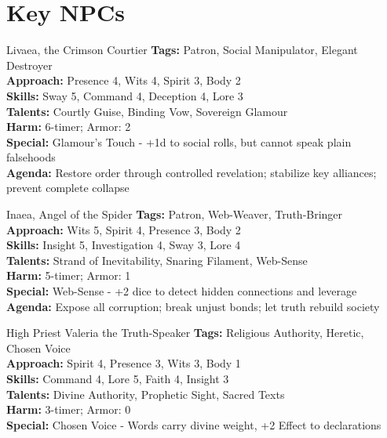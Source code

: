 \documentclass[11pt]{article}
\begin{document}
\section*{Key NPCs}

\begin{npcbox}{Livaea, the Crimson Courtier}
    \textbf{Tags:} Patron, Social Manipulator, Elegant Destroyer \\
    \textbf{Approach:} Presence 4, Wits 4, Spirit 3, Body 2 \\
    \textbf{Skills:} Sway 5, Command 4, Deception 4, Lore 3 \\
    \textbf{Talents:} Courtly Guise, Binding Vow, Sovereign Glamour \\
    \textbf{Harm:} 6-timer; Armor: 2 \\
    \textbf{Special:} Glamour's Touch - +1d to social rolls, but cannot speak plain falsehoods \\
    \textbf{Agenda:} Restore order through controlled revelation; stabilize key alliances; prevent complete collapse
\end{npcbox}

\begin{npcbox}{Inaea, Angel of the Spider}
    \textbf{Tags:} Patron, Web-Weaver, Truth-Bringer \\
    \textbf{Approach:} Wits 5, Spirit 4, Presence 3, Body 2 \\
    \textbf{Skills:} Insight 5, Investigation 4, Sway 3, Lore 4 \\
    \textbf{Talents:} Strand of Inevitability, Snaring Filament, Web-Sense \\
    \textbf{Harm:} 5-timer; Armor: 1 \\
    \textbf{Special:} Web-Sense - +2 dice to detect hidden connections and leverage \\
    \textbf{Agenda:} Expose all corruption; break unjust bonds; let truth rebuild society
\end{npcbox}

\begin{npcbox}{High Priest Valeria the Truth-Speaker}
    \textbf{Tags:} Religious Authority, Heretic, Chosen Voice \\
    \textbf{Approach:} Spirit 4, Presence 3, Wits 3, Body 1 \\
    \textbf{Skills:} Command 4, Lore 5, Faith 4, Insight 3 \\
    \textbf{Talents:} Divine Authority, Prophetic Sight, Sacred Texts \\
    \textbf{Harm:} 3-timer; Armor: 0 \\
    \textbf{Special:} Chosen Voice - Words carry divine weight, +2 Effect to declarations
\end{npcbox}
\end{document}

